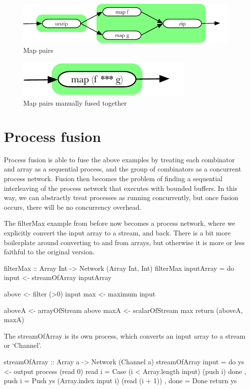 \begin{figure}
\center
\includegraphics{figs/combinators/mappairs-zip.pdf}
\caption{Map pairs}
\label{fig:combinators:mappairs-zip}
\end{figure}

\begin{figure}
\center
\includegraphics{figs/combinators/mappairs-arrow.pdf}
\caption{Map pairs manually fused together}
\label{fig:combinators:mappairs-arrow}
\end{figure}

\section{Process fusion}

Process fusion is able to fuse the above examples by treating each combinator and array as a sequential process, and the group of combinators as a concurrent process network.
Fusion then becomes the problem of finding a sequential interleaving of the process network that executes with bounded buffers.
In this way, we can abstractly treat processes as running concurrently, but once fusion occurs, there will be no concurrency overhead.

The filterMax example from before now becomes a process network, where we explicitly convert the input array to a stream, and back.
There is a bit more boilerplate around converting to and from arrays, but otherwise it is more or less faithful to the original version.
\begin{code}
filterMax :: Array Int -> Network (Array Int, Int)
filterMax inputArray
 = do input  <- streamOfArray  inputArray

      above  <- filter (>0)    input
      max    <- maximum        input

      aboveA <- arrayOfStream  above
      maxA   <- scalarOfStream max
      return (aboveA, maxA)
\end{code}

The streamOfArray is its own process, which converts an input array to a stream or `Channel'.
\begin{code}
streamOfArray :: Array a -> Network (Channel a)
streamOfArray input
 = do ys <- output
      process (read 0)
       { read i = Case (i < Array.length input) (push i) done
       , push i = Push ys (Array.index input i) (read (i + 1))
       , done   = Done
       }
      return ys
\end{code}

